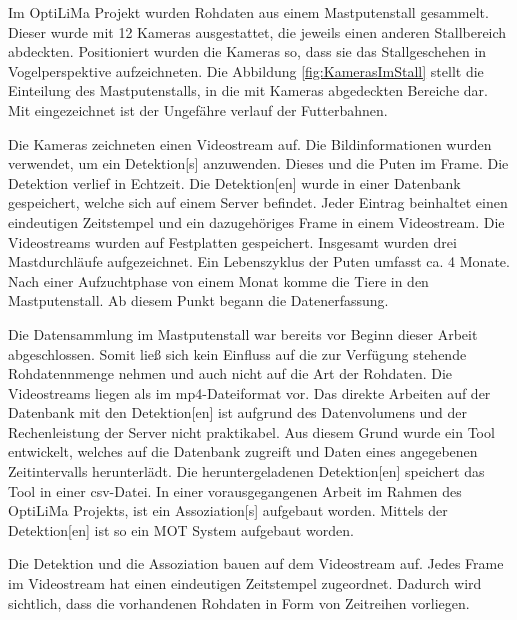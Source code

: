 Im \acrshort{OptiLiMa} Projekt wurden Rohdaten aus einem Mastputenstall gesammelt. Dieser wurde mit 12 Kameras ausgestattet, die jeweils einen anderen Stallbereich abdeckten. Positioniert wurden die Kameras so, dass sie das Stallgeschehen in Vogelperspektive aufzeichneten. Die Abbildung \ref{fig:KamerasImStall} stellt die Einteilung des Mastputenstalls, in die mit Kameras abgedeckten Bereiche dar. Mit eingezeichnet ist der Ungefähre verlauf der Futterbahnen.


Die Kameras zeichneten einen Videostream auf. Die Bildinformationen wurden verwendet, um ein \gls{Detektion}[s] anzuwenden. Dieses  und  die Puten im \gls{Frame}. Die \gls{Detektion} verlief in Echtzeit. Die \gls{Detektion}[en] wurde in einer Datenbank gespeichert, welche sich auf einem Server befindet. Jeder Eintrag beinhaltet einen eindeutigen Zeitstempel und ein dazugehöriges \gls{Frame} in einem Videostream. Die Videostreams wurden auf Festplatten gespeichert. Insgesamt wurden  drei Mastdurchläufe aufgezeichnet. Ein Lebenszyklus der Puten umfasst ca. 4 Monate. Nach einer Aufzuchtphase von einem Monat komme die Tiere in den Mastputenstall. Ab diesem Punkt begann die Datenerfassung. \par

Die Datensammlung im Mastputenstall war bereits vor Beginn dieser Arbeit abgeschlossen. Somit ließ sich kein Einfluss auf die zur Verfügung stehende Rohdatennmenge nehmen und auch nicht auf die Art der Rohdaten. Die Videostreams liegen als im mp4-Dateiformat vor. Das direkte Arbeiten auf der Datenbank mit den \gls{Detektion}[en] ist aufgrund des Datenvolumens und der Rechenleistung der Server nicht praktikabel. Aus diesem Grund wurde ein Tool entwickelt, welches auf die Datenbank zugreift und Daten eines angegebenen Zeitintervalls herunterlädt. Die heruntergeladenen \gls{Detektion}[en] speichert das Tool in einer csv-Datei. In einer vorausgegangenen Arbeit im Rahmen des \acrshort{OptiLiMa} Projekts, ist ein \gls{Assoziation}[s] aufgebaut worden. Mittels der \gls{Detektion}[en] ist so ein \gls{MOT} System aufgebaut worden. \par

Die \gls{Detektion} und die \gls{Assoziation} bauen auf dem Videostream auf. Jedes \gls{Frame} im Videostream hat einen eindeutigen Zeitstempel zugeordnet. Dadurch wird sichtlich, dass die vorhandenen Rohdaten in Form von Zeitreihen vorliegen.

